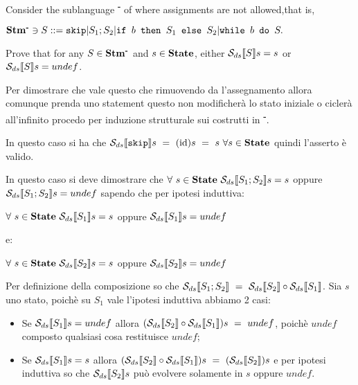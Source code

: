 \newcommand{\stmminus}{\stm{}\textsuperscript{\textbf{-}}}

{
    Consider the sublanguage \stmminus{} of \stm{} where assignments are not allowed,that is,
    \begin{center}
    $\stmminus{} \ni{} S ::= \skipistr | S_1;S_2 | \ifABC{b}{S_1}{S_2} | \wbS{b}{S}.$
    \end{center}
    Prove that for any $S\in\stmminus{}$ and $s\in\mbox{\textbf{State}}$, either $\mathcal{S}_{ds}\llbracket S \rrbracket{}s=s$ or $\mathcal{S}_{ds}\llbracket S \rrbracket{}s=undef$.
}
{
    Per dimostrare che vale questo che rimuovendo da \stm{} l'assegnamento
    allora comunque prenda uno statement questo non modificherà lo stato
    iniziale o ciclerà all'infinito procedo per induzione strutturale sui
    costrutti in \stmminus{}.

     In questo caso si ha che $\mathcal{S}_{ds}\llbracket \textrm{\normalfont{\texttt{skip}}} \rrbracket s~
    =~(\textrm{\normalfont{id}})s~=~s~\forall{}s\in\mbox{\textbf{State}}$ quindi l'asserto è valido.

     In questo caso si deve dimostrare che 
    $\forall~s\in\mbox{\textbf{State}}~\mathcal{S}_{ds}\llbracket S_1;S_2 \rrbracket s=s$ oppure $\mathcal{S}_{ds}\llbracket S_1;S_2 \rrbracket s=undef$
    sapendo che per ipotesi induttiva:
    \begin{center}
    $\forall~s\in\mbox{\textbf{State}}~\mathcal{S}_{ds}\llbracket S_1 \rrbracket s=s$ oppure $\mathcal{S}_{ds}\llbracket S_1 \rrbracket s=undef$
    \end{center}
    e:
    \begin{center}
    $\forall~s\in\mbox{\textbf{State}}~\mathcal{S}_{ds}\llbracket S_2 \rrbracket s=s$ oppure $\mathcal{S}_{ds}\llbracket S_2 \rrbracket s=undef$
    \end{center}
    Per definizione della composizione so che 
    $\mathcal{S}_{ds}\llbracket S_1;S_2 \rrbracket~=~\mathcal{S}_{ds}\llbracket S_2 \rrbracket \circ \mathcal{S}_{ds}\llbracket S_1 \rrbracket$. Sia $s$ uno stato,
    poichè su $S_1$ vale l'ipotesi induttiva abbiamo 2 casi:
    
    \begin{itemize}
    \item Se $\mathcal{S}_{ds}\llbracket S_1 \rrbracket s=undef$ allora $(\mathcal{S}_{ds}\llbracket S_2 \rrbracket \circ \mathcal{S}_{ds}\llbracket S_1 \rrbracket)s~=~
    undef$, poichè $undef$ composto qualsiasi cosa restituisce $undef$;

    \item Se $\mathcal{S}_{ds}\llbracket S_1 \rrbracket s=s$ allora $(\mathcal{S}_{ds}\llbracket S_2 \rrbracket \circ \mathcal{S}_{ds}\llbracket S_1 \rrbracket)s~=~
    (\mathcal{S}_{ds}\llbracket S_2 \rrbracket)s$ e per ipotesi induttiva so che $\mathcal{S}_{ds}\llbracket S_2 \rrbracket s$ può
    evolvere solamente in $s$ oppure $undef$. 
    \end{itemize}

}
